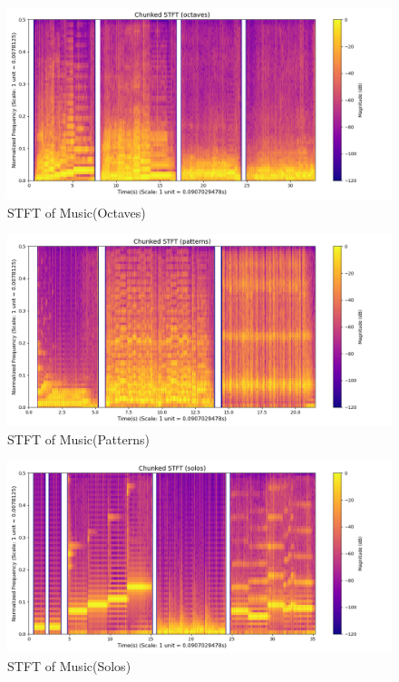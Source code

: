 \documentclass[12pt,a4paper,onecolumn]{exam}
\begin{document}
\begin{solution}
        \begin{figure}[H]
        \centering
        \includegraphics[scale = 0.45]{music_octaves_stft.png}
        \caption{STFT of Music(Octaves)}
        \label{fig:38}
        \end{figure}

        \begin{figure}[H]
        \centering
        \includegraphics[scale = 0.45]{music_patterns_stft.png}
        \caption{STFT of Music(Patterns)}
        \label{fig:39}
        \end{figure}

        \begin{figure}[H]
        \centering
        \includegraphics[scale = 0.45]{music_solos_stft.png}
        \caption{STFT of Music(Solos)}
        \label{fig:40}
        \end{figure}


\end{solution}
\end{document}
